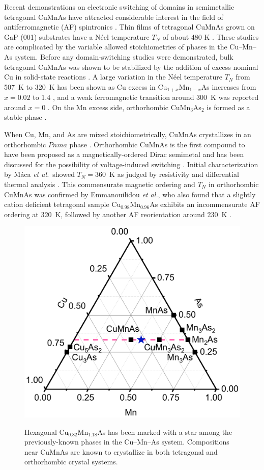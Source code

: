 \documentclass[10pt,doublespacing,edeposit]{uiucthesis2020}
\begin{document}
\begin{mainmatter}
Recent demonstrations on electronic switching of domains in  semimetallic tetragonal CuMnAs have attracted considerable interest in the field of antiferromagnetic (AF) spintronics \cite{Wadley2016,Grzybowski2017,Wadley2018,Matalla-Wagner2019}. Thin films of tetragonal CuMnAs grown on GaP (001) substrates have a N\'eel temperature $T_N$ of about 480 K \cite{Wadley2015,Hills2015}.
These studies are complicated by the variable allowed stoichiometries of  phases in the Cu--Mn--As system.
Before any domain-switching studies were demonstrated, bulk tetragonal CuMnAs was shown to be 
stabilized by the addition of excess nominal Cu in solid-state reactions \cite{Uhlirova2015}.
A large variation in the N\'{e}el temperature $T_N$ from 507~K to 320~K has been shown as Cu excess in Cu$_{1+x}$Mn$_{1-x}$As increases from $x = 0.02$ to 1.4 \cite{Uhlirova2019}, and a weak ferromagnetic transition around 300~K was reported around $x=0$ \cite{Nateprov2011}.
On the Mn excess side, orthorhombic CuMn$_3$As$_2$ is formed as a stable phase \cite{Uhlirova2015}.
 
When Cu, Mn, and As are mixed stoichiometrically, CuMnAs crystallizes in an orthorhombic $Pnma$ phase \cite{MacA2012}.
Orthorhombic CuMnAs is the first compound to have been proposed as a magnetically-ordered Dirac semimetal \cite{Tang2016} and has been discussed for the possibility of voltage-induced switching \cite{Kim2018}.
Initial characterization by M\'{a}ca \emph{et al.}\ showed $T_N = 360$~K as judged by resistivity and differential thermal analysis \cite{MacA2012}. This commensurate magnetic ordering and $T_N$ in orthorhombic CuMnAs was confirmed by Emmanouilidou \emph{et al.}, who also found that a slightly cation deficient tetragonal sample Cu$_{0.98}$Mn$_{0.96}$As exhibits an incommensurate AF ordering at 320~K, followed by another AF reorientation around 230~K \cite{emmanouilidou_magnetic_2017}.

\begin{figure}
\centering\includegraphics[width=0.6\columnwidth]{figures/ch5/phase_diagram_cropped.pdf} \\
\caption{\label{fig:phase_diagram}
{\color{black}Hexagonal Cu$_{0.82}$Mn$_{1.18}$As has been marked with a star among the previously-known phases in the Cu--Mn--As system. Compositions near CuMnAs are known to crystallize in both tetragonal and orthorhombic crystal systems.}
} 
\end{figure}


\end{mainmatter}
\end{document}
